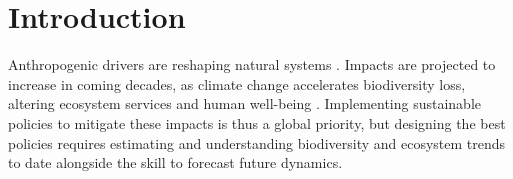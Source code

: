 \documentclass[11pt]{article}
\begin{document}
\begin{abstract}
\end{abstract}

\linenumbers

\section{Introduction}

Anthropogenic drivers are reshaping natural systems \citep{Diaz2019}. Impacts are projected to increase in coming decades, as climate change accelerates biodiversity loss, altering ecosystem services and human well-being \citep{IPBES2019}.
Implementing sustainable policies to mitigate these impacts is thus a global priority, but designing the best policies requires estimating and understanding biodiversity and ecosystem trends to date alongside the skill to forecast future dynamics. %
\end{document}

